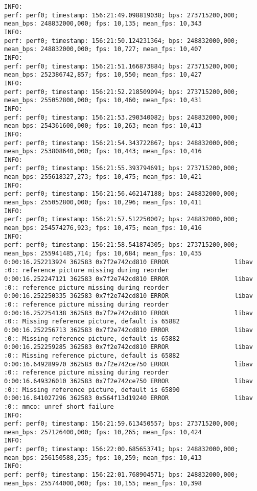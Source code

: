 \documentclass[12pt,oneside]{book}
\begin{document}
\begin{lstlisting}
INFO:
perf: perf0; timestamp: 156:21:49.098819038; bps: 273715200,000; mean_bps: 248832000,000; fps: 10,135; mean_fps: 10,343
INFO:
perf: perf0; timestamp: 156:21:50.124231364; bps: 248832000,000; mean_bps: 248832000,000; fps: 10,727; mean_fps: 10,407
INFO:
perf: perf0; timestamp: 156:21:51.166873884; bps: 273715200,000; mean_bps: 252386742,857; fps: 10,550; mean_fps: 10,427
INFO:
perf: perf0; timestamp: 156:21:52.218509094; bps: 273715200,000; mean_bps: 255052800,000; fps: 10,460; mean_fps: 10,431
INFO:
perf: perf0; timestamp: 156:21:53.290340082; bps: 248832000,000; mean_bps: 254361600,000; fps: 10,263; mean_fps: 10,413
INFO:
perf: perf0; timestamp: 156:21:54.343722867; bps: 248832000,000; mean_bps: 253808640,000; fps: 10,443; mean_fps: 10,416
INFO:
perf: perf0; timestamp: 156:21:55.393794691; bps: 273715200,000; mean_bps: 255618327,273; fps: 10,475; mean_fps: 10,421
INFO:
perf: perf0; timestamp: 156:21:56.462147188; bps: 248832000,000; mean_bps: 255052800,000; fps: 10,296; mean_fps: 10,411
INFO:
perf: perf0; timestamp: 156:21:57.512250007; bps: 248832000,000; mean_bps: 254574276,923; fps: 10,475; mean_fps: 10,416
INFO:
perf: perf0; timestamp: 156:21:58.541874305; bps: 273715200,000; mean_bps: 255941485,714; fps: 10,684; mean_fps: 10,435
0:00:16.252213924 362583 0x7f2e742cd810 ERROR                  libav :0:: reference picture missing during reorder
0:00:16.252247121 362583 0x7f2e742cd810 ERROR                  libav :0:: reference picture missing during reorder
0:00:16.252250335 362583 0x7f2e742cd810 ERROR                  libav :0:: reference picture missing during reorder
0:00:16.252254138 362583 0x7f2e742cd810 ERROR                  libav :0:: Missing reference picture, default is 65882
0:00:16.252256713 362583 0x7f2e742cd810 ERROR                  libav :0:: Missing reference picture, default is 65882
0:00:16.252259285 362583 0x7f2e742cd810 ERROR                  libav :0:: Missing reference picture, default is 65882
0:00:16.649289970 362583 0x7f2e742ce750 ERROR                  libav :0:: reference picture missing during reorder
0:00:16.649326010 362583 0x7f2e742ce750 ERROR                  libav :0:: Missing reference picture, default is 65890
0:00:16.841027296 362583 0x564f13d19240 ERROR                  libav :0:: mmco: unref short failure
INFO:
perf: perf0; timestamp: 156:21:59.613450557; bps: 273715200,000; mean_bps: 257126400,000; fps: 10,265; mean_fps: 10,424
INFO:
perf: perf0; timestamp: 156:22:00.685653741; bps: 248832000,000; mean_bps: 256150588,235; fps: 10,259; mean_fps: 10,413
INFO:
perf: perf0; timestamp: 156:22:01.768904571; bps: 248832000,000; mean_bps: 255744000,000; fps: 10,155; mean_fps: 10,398

\end{lstlisting}
\end{document}
